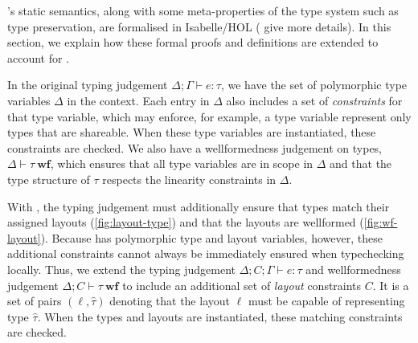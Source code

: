 
%



\Cogent's static semantics, along with some meta-properties
of the type system such as type preservation, are formalised in Isabelle/HOL
(\citet{OConnor:2016,Cogent_JFP_2021} give more details). In this section, we explain
how these formal proofs and definitions are extended to account for \Dargent.

In the original \Cogent typing judgement $\Delta;\Gamma \vdash e : \tau$, we have the set of polymorphic type variables $\Delta$ in the context. Each entry in $\Delta$ also includes a set of \emph{constraints} for that type variable, which may enforce, for example, a type variable represent only types that are shareable.
 When these type variables are instantiated, these constraints are checked. We also have a wellformedness judgement on types, $\Delta \vdash \tau\ \mathbf{wf}$, which ensures that all type variables are in scope in $\Delta$ and that the type structure of $\tau$ respects the linearity constraints in $\Delta$. 

With \Dargent, the typing judgement must additionally ensure that \cogent types
match their assigned layouts (\autoref{fig:layout-type}) and that the layouts
are wellformed (\autoref{fig:wf-layout}). Because \cogent has
polymorphic type and layout variables, however, these additional constraints
cannot always be immediately ensured when typechecking locally. Thus, we
extend the \cogent typing judgement $\Delta;C;\Gamma \vdash e : \tau$ and
wellformedness judgement $\Delta; C \vdash \tau\ \mathbf{wf}$ to include an
additional set of \emph{layout} constraints $C$. It
is a set of pairs $(\ell,\hat{\tau})$ denoting that the layout $\ell$ must
be capable of representing type $\hat{\tau}$. When the types and layouts are instantiated, these matching constraints are checked.

